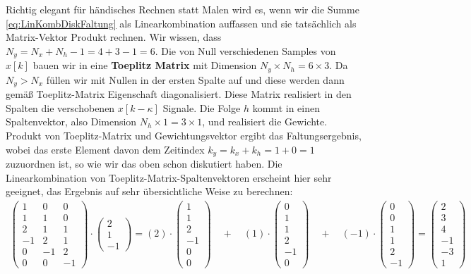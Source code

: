 Richtig elegant für händisches Rechnen statt Malen wird es,
wenn wir die Summe \eqref{eq:LinKombDiskFaltung} als
Linearkombination auffassen und
sie tatsächlich als Matrix-Vektor Produkt rechnen. Wir wissen, dass $N_y=N_x+N_h-1=4+3-1=6$.
%
Die von Null verschiedenen Samples von $x[k]$
bauen wir in eine \textbf{Toeplitz Matrix} mit Dimension $N_y \times N_h = 6 \times 3$.
%
Da $N_y > N_x$ füllen wir mit Nullen in der ersten Spalte auf und diese werden
dann gemäß Toeplitz-Matrix Eigenschaft diagonalisiert.
%
Diese Matrix realisiert in den Spalten die verschobenen $x[k-\kappa]$ Signale.
%
Die Folge $h$ kommt in einen Spaltenvektor, also Dimension $N_h \times 1 = 3 \times 1$,
und realisiert die Gewichte.
%
Produkt von Toeplitz-Matrix und Gewichtungsvektor ergibt das Faltungsergebnis,
wobei das erste Element davon dem Zeitindex $k_y = k_x + k_h = 1 + 0 = 1$ zuzuordnen
ist, so wie wir das oben schon diskutiert haben.
%
Die Linearkombination von Toeplitz-Matrix-Spaltenvektoren erscheint hier sehr geeignet,
das Ergebnis auf sehr übersichtliche Weise zu berechnen:
%
\begin{align}
\begin{pmatrix}
1 & 0 & 0 \\
1 & 1 & 0 \\
2 & 1 & 1 \\
-1 & 2 & 1 \\
0 & -1 & 2 \\
0 & 0 & -1
\end{pmatrix}
\cdot
\begin{pmatrix}
2\\1\\-1
\end{pmatrix}
=
(2) \cdot
\begin{pmatrix}
1\\
1\\
2\\
-1\\
0 \\
0
\end{pmatrix}
\quad+\quad
(1) \cdot
\begin{pmatrix}
0\\
1\\
1\\
2\\
-1\\
0
\end{pmatrix}
\quad+\quad
(-1) \cdot
\begin{pmatrix}
0 \\
0 \\
1 \\
1 \\
2 \\
-1
\end{pmatrix}
=
\begin{pmatrix}
2 \\
3 \\
4 \\
-1 \\
-3 \\
1
\end{pmatrix}
\end{align}

